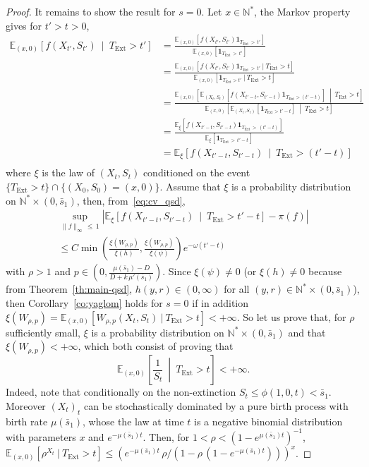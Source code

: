 \documentclass[10pt]{amsart}
\theoremstyle{definition}\newtheorem{defi}[theo]{Definition}\newtheorem{rema}[theo]{Remark}\newtheorem{exam}[theo]{Example}\newtheorem{exem}[theo]{Example}\newtheorem{nota}[theo]{Notation}
\newcommand{\NN}{\mathbb{N}}
\newcommand{\EE}{\mathbb{E}}
\newcommand{\Text}{T_{\mathrm{Ext}}}
\newcommand{\1}{\mathbf{1}}
\begin{document}
\begin{proof}
It remains to show the result for $s=0$. Let $x\in \NN^*$, the Markov property gives for $t'>t>0$,
\begin{align*}
\EE_{(x,0)} \left[f(X_{t'},S_{t'}) \ \middle| \ \Text>t'\right] &=\frac{\EE_{(x,0)} \left[f\left(X_{t'},S_{t'}\right) \1_{\Text\,>\,t'} \right]}{\EE_{(x,0)} \left[\1_{\Text\,>\,t'}\right]}\\
& =\frac{\EE_{(x,0)} \left[f(X_{t'},S_{t'}) \1_{\Text\,>\,t'} \ | \ \Text> t \right]}{\EE_{(x,0)} \left[\1_{\Text>t'} \ | \ \Text> t\right]}\\
&=\frac{\EE_{(x,0)} \left[\EE_{\left(X_{t},S_{t}\right)}\left[f\left(X_{t'-t},S_{t'-t}\right) \1_{\Text>(t'-t)} \right] \ \middle| \ \Text> t \right]}{\EE_{(x,0)} \left[\EE_{(X_{t},S_{t})}\left[\1_{\Text>t'-t} \right] \ \middle| \ \Text> t \right]}\\
&=\frac{\EE_{\xi} \left[f\left(X_{t'-t},S_{t'-t}\right) \1_{\Text\,>\,(t'-t)} \right]}{\EE_{\xi} \left[\1_{\Text\,>\,t'-t} \right] }\\
&=\EE_{\xi} \left[f(X_{t'-t},S_{t'-t}) \ \middle| \ \Text>(t'-t) \right]\\
\end{align*}
where $\xi$ is the law of $(X_{t},S_{t})$ conditioned on the event $\{ \Text> t \}\cap\{(X_0,S_0)=(x,0)\}$. Assume that $\xi$ is a probability distribution on $\NN^*\times (0,\bar s_1)$, then, from~\eqref{eq:cv_qsd},
\begin{multline*}
\sup_{\|f \|_\infty\,\leq\,1 } \left|\EE_{\xi} \left[f(X_{t'-t},S_{t'-t}) \ \middle| \ \Text>t'-t\right] - \pi(f) \right| \\
\leq C \min\left(\frac{\xi\left(W_{\rho,p}\right)}{\xi(h)}, \frac{\xi\left(W_{\rho,p}\right)}{\xi(\psi)}\right) e^{-\omega (t'-t)}
\end{multline*}
with $\rho>1$ and $p\in(0,\frac{\mu(\bar s_1)-D}{D+k\,\mu'(\bar s_1)})$. Since $\xi(\psi)\neq 0$ (or $\xi(h)\neq 0$ because from Theorem~\ref{th:main-qsd}, $h(y,r)\in(0,\infty)$ for all $(y,r)\in\NN^*\times (0,\bar s_1)$), then Corollary~\ref{co:yaglom} holds for $s=0$ if in addition $\xi(W_{\rho,p})=\EE_{(x,0)}[W_{\rho,p}(X_t,S_t) \ | \ \Text> t]<+\infty$. So let us prove that, for $\rho$ sufficiently small, $\xi$ is a probability distribution on $\NN^*\times (0,\bar s_1)$ and that $\xi(W_{\rho,p})<+\infty$, which both consist of proving that
\[
\EE_{(x,0)}\left[\frac{1}{S_t} \ \middle| \ \Text >t\right] <+\infty.
\]
Indeed, note that conditionally on the non-extinction $S_t\leq \phi(1,0,t)< \bar s_1$. Moreover $(X_t)_t$ can be stochastically dominated by a pure birth process with birth rate $\mu(\bar s_1)$, whose the law at time $t$ is a negative binomial distribution with parameters $x$ and $e^{- \mu(\bar s_1) t}$. Then, for $1<\rho<(1-e^{\mu(\bar s_1)t})^{-1}$, $\EE_{(x,0)}[\rho^{X_t} \ | \ \Text >t]\leq (e^{- \mu(\bar s_1) t}\,\rho /(1- \rho\,(1-e^{- \mu(\bar s_1) t})))^x$.



\end{proof}
\end{document}
